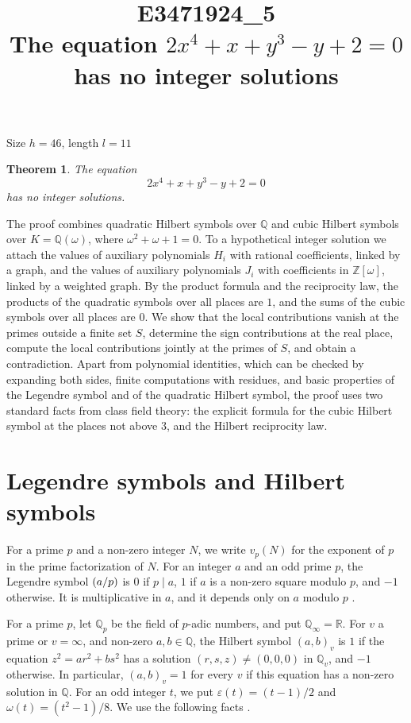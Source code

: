\documentclass[11pt]{article}
\title{\textbf{E3471924\_5}\\[4pt] {\Large The equation $2x^{4}+x+y^{3}-y+2=0$ has no integer solutions}}
\author{}
\date{}
\newtheorem{theorem}{Theorem}
\newcommand{\Z}{\mathbb{Z}}
\newcommand{\Q}{\mathbb{Q}}
\newcommand{\leg}[2]{\mathchoice{\biggl(\dfrac{#1}{#2}\biggr)}{(#1/#2)}{(#1/#2)}{(#1/#2)}}
\begin{document}
\maketitle
\vspace{-8ex}
\begin{center}
Size $h=46$, length $l=11$
\end{center}

\begin{theorem}\label{thm:main}
The equation
\begin{equation}\label{eq:main}
2x^{4}+x+y^{3}-y+2=0
\end{equation}
has no integer solutions.
\end{theorem}

The proof combines quadratic Hilbert symbols over $\Q$ and cubic Hilbert symbols over $K=\Q(\omega)$, where $\omega^2+\omega+1=0$. To a hypothetical integer solution we attach the values of auxiliary polynomials $H_i$ with rational coefficients, linked by a graph, and the values of auxiliary polynomials $J_i$ with coefficients in $\Z[\omega]$, linked by a weighted graph. By the product formula and the reciprocity law, the products of the quadratic symbols over all places are $1$, and the sums of the cubic symbols over all places are $0$. We show that the local contributions vanish at the primes outside a finite set $S$, determine the sign contributions at the real place, compute the local contributions jointly at the primes of $S$, and obtain a contradiction. Apart from polynomial identities, which can be checked by expanding both sides, finite computations with residues, and basic properties of the Legendre symbol and of the quadratic Hilbert symbol, the proof uses two standard facts from class field theory: the explicit formula for the cubic Hilbert symbol at the places not above $3$, and the Hilbert reciprocity law.

\section{Legendre symbols and Hilbert symbols}

For a prime $p$ and a non-zero integer $N$, we write $v_p(N)$ for the exponent of $p$ in the prime factorization of $N$. For an integer $a$ and an odd prime $p$, the Legendre symbol $\leg{a}{p}$ is $0$ if $p\mid a$, $1$ if $a$ is a non-zero square modulo $p$, and $-1$ otherwise. It is multiplicative in $a$, and it depends only on $a$ modulo $p$ \cite[Chapter~5]{IR}.

For a prime $p$, let $\Q_p$ be the field of $p$-adic numbers, and put $\Q_\infty=\mathbb R$. For $v$ a prime or $v=\infty$, and non-zero $a,b\in\Q$, the Hilbert symbol $(a,b)_v$ is $1$ if the equation $z^2=ar^2+bs^2$ has a solution $(r,s,z)\neq(0,0,0)$ in $\Q_v$, and $-1$ otherwise. In particular, $(a,b)_v=1$ for every $v$ if this equation has a non-zero solution in $\Q$. For an odd integer $t$, we put $\varepsilon(t)=(t-1)/2$ and $\omega(t)=(t^2-1)/8$. We use the following facts \cite[Chapter~III, Proposition~2 and Theorems~1 and~3]{Se}.
\end{document}
